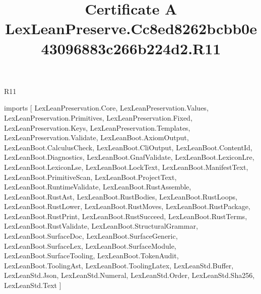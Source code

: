 \begin{lexlean}{R11}
\title{Certificate A LexLeanPreserve.Cc8ed8262bcbb0e43096883c266b224d2.R11}
\begin{coremodule}
imports [
  LexLeanPreservation.Core,
  LexLeanPreservation.Values,
  LexLeanPreservation.Primitives,
  LexLeanPreservation.Fixed,
  LexLeanPreservation.Keys,
  LexLeanPreservation.Templates,
  LexLeanPreservation.Validate,
  LexLeanBoot.AxiomOutput,
  LexLeanBoot.CalculusCheck,
  LexLeanBoot.CliOutput,
  LexLeanBoot.ContentId,
  LexLeanBoot.Diagnostics,
  LexLeanBoot.GnafValidate,
  LexLeanBoot.LexiconLre,
  LexLeanBoot.LexiconLse,
  LexLeanBoot.LockText,
  LexLeanBoot.ManifestText,
  LexLeanBoot.PrimitiveScan,
  LexLeanBoot.ProjectText,
  LexLeanBoot.RuntimeValidate,
  LexLeanBoot.RustAssemble,
  LexLeanBoot.RustAst,
  LexLeanBoot.RustBodies,
  LexLeanBoot.RustLoops,
  LexLeanBoot.RustLower,
  LexLeanBoot.RustMoves,
  LexLeanBoot.RustPackage,
  LexLeanBoot.RustPrint,
  LexLeanBoot.RustSucceed,
  LexLeanBoot.RustTerms,
  LexLeanBoot.RustValidate,
  LexLeanBoot.StructuralGrammar,
  LexLeanBoot.SurfaceDoc,
  LexLeanBoot.SurfaceGeneric,
  LexLeanBoot.SurfaceLex,
  LexLeanBoot.SurfaceModule,
  LexLeanBoot.SurfaceTooling,
  LexLeanBoot.TokenAudit,
  LexLeanBoot.ToolingAst,
  LexLeanBoot.ToolingLatex,
  LexLeanStd.Buffer,
  LexLeanStd.Json,
  LexLeanStd.Numeral,
  LexLeanStd.Order,
  LexLeanStd.Sha256,
  LexLeanStd.Text
]


\end{coremodule}
\end{lexlean}
